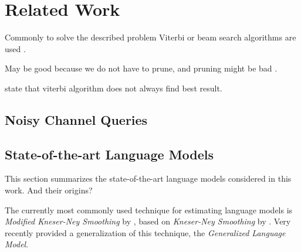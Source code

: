 \chapter{Related Work}
\label{ch:relatedwork}

\begin{draft}
Commonly to solve the described problem Viterbi or beam search algorithms are
used .
\end{draft}


\begin{draft}
May be good because we do not have to prune, and pruning might be bad
\parencite{Stolcke2000,Chelba2013,Chelba2010,Siivola2007}.

\textcite{Bickel2005} state that viterbi algorithm does not always find best
result.
\end{draft}

\section{Noisy Channel Queries}

\section{State-of-the-art Language Models}

\begin{draft}
This section summarizes the state-of-the-art language models considered in this
work.
And their origins?
\end{draft}

The currently most commonly used \parencite{JurafskyMartin2009,Chelba2013}
technique for estimating language models is \emph{Modified Kneser-Ney Smoothing}
by \textcite{ChenGoodman1996,ChenGoodman1998,ChenGoodman1999}, based on
\emph{Kneser-Ney Smoothing} by \textcite{KneserNey1995}.
Very recently \textcite{Pickhardt2014} provided a generalization of this technique,
the \emph{Generalized Language Model}.

